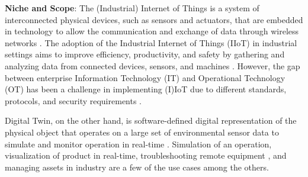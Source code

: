 

\textbf{Niche and Scope}:
% 
The (Industrial) Internet of Things is a system of interconnected physical devices, such as sensors and actuators, that are embedded in technology to allow the communication and exchange of data through wireless networks \cite{maillet-contozEndtoendSecurityValidation2020}. The adoption of the Industrial Internet of Things (IIoT) in industrial settings aims to improve efficiency, productivity, and safety by gathering and analyzing data from connected devices, sensors, and machines \cite{kumarBlockchainDeepLearning2022}. However, the gap between enterprise Information Technology (IT) and Operational Technology (OT) has been a challenge in implementing (I)IoT due to different standards, protocols, and security requirements \cite{adrienbacueDigitalTwinsEnhanced2022}.

Digital Twin, on the other hand, is software-defined digital representation of the physical object that operates on a large set of environmental sensor data to simulate and monitor operation in real-time \cite{williamdanilczykANGELIntelligentDigital2019, danilczykSmartGridAnomaly2021}. Simulation of an operation, visualization of product in real-time, troubleshooting remote equipment \cite{alcarazDigitalTwinComprehensive2022, veledarDigitalTwinsDependability2019, vargheseDigitalTwinbasedIntrusion2022}, and managing assets in industry are a few of the use cases among the others. 

